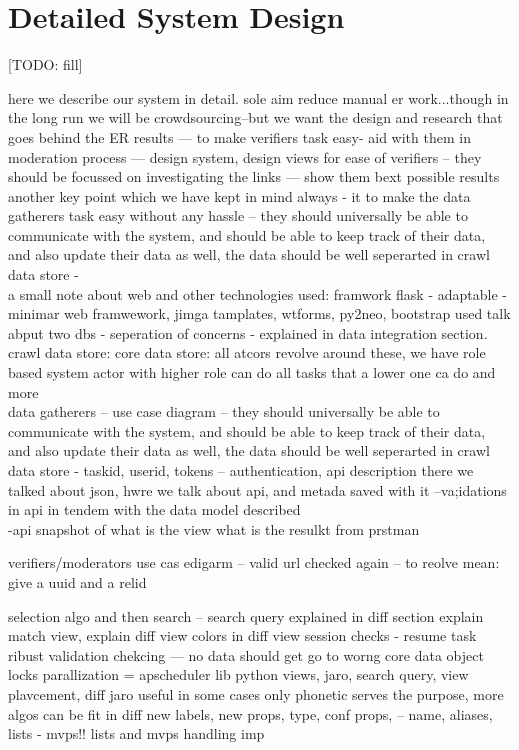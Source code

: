 \chapter{Detailed System Design}

[TODO: fill]

here we describe our system in detail. sole aim reduce manual er work...though in the long run we will be 
crowdsourcing--but we want the design and research that goes behind the ER results ---  
to make verifiers task easy- aid with them in moderation process ---  design system, design views for ease of verifiers --  they should be focussed on investigating the links --- show them bext possible results \\

another key point which we have kept in mind always - 
it to make the data gatherers task easy without any hassle
 -- they should universally be able to communicate with the system, and should be able to keep track of their data, and also update their data as well, the data should be well seperarted in crawl data store - \\


a small note about web and other technologies used: framwork flask - adaptable - minimar web framwework, jimga tamplates, wtforms, py2neo, bootstrap used
talk abput two dbs - seperation of concerns -  explained in data integration section. 
crawl data store:
core data store:
all atcors revolve around these, we have role based system
actor with higher role can do all tasks that a lower one ca do and more \\


data gatherers --
use case diagram
  -- they should universally be able to communicate with the system, and should be able to keep track of their data, and also update their data as well, the data should be well seperarted in crawl data store - taskid, userid, tokens -- authentication, api description
  there we talked about json, hwre we talk about api, and metada saved with it
  --va;idations in api in tendem with the data model described  \\
-api snapshot
of what is the view
what is the resulkt from prstman

verifiers/moderators 
use cas edigarm
-- valid url checked again --
to reolve mean: give a uuid and a relid 

selection algo
and then search -- search query explained in diff section
explain match view, explain diff view
colors in diff view
session checks - resume task
ribust validation chekcing --- no data should get go to worng core data object
locks parallization = apscheduler lib python
views, jaro, search query, view plavcement, diff
jaro useful in some cases only
phonetic serves the purpose, more algos can be fit in
diff new labels, new props, type, conf props, -- name, aliases, lists - mvps!! 
lists and mvps handling imp \\



